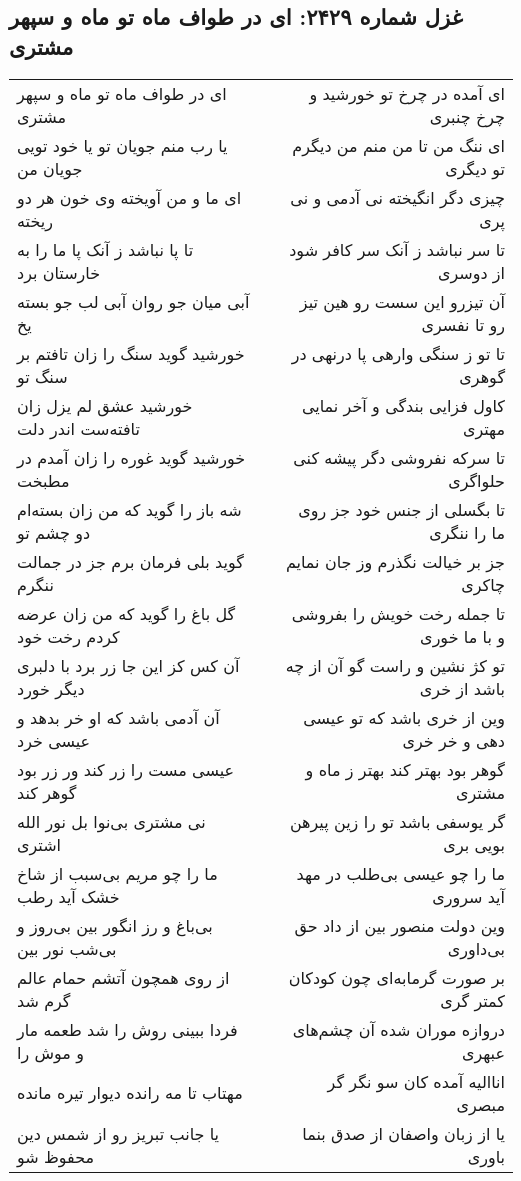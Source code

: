 \begin{center}
\section*{غزل شماره ۲۴۲۹: ای در طواف ماه تو ماه و سپهر مشتری}
\label{sec:2429}
\begin{longtable}{l p{0.5cm} r}
ای در طواف ماه تو ماه و سپهر مشتری
&&
ای آمده در چرخ تو خورشید و چرخ چنبری
\\
یا رب منم جویان تو یا خود تویی جویان من
&&
ای ننگ من تا من منم من دیگرم تو دیگری
\\
ای ما و من آویخته وی خون هر دو ریخته
&&
چیزی دگر انگیخته نی آدمی و نی پری
\\
تا پا نباشد ز آنک پا ما را به خارستان برد
&&
تا سر نباشد ز آنک سر کافر شود از دوسری
\\
آبی میان جو روان آبی لب جو بسته یخ
&&
آن تیزرو این سست رو هین تیز رو تا نفسری
\\
خورشید گوید سنگ را زان تافتم بر سنگ تو
&&
تا تو ز سنگی وارهی پا درنهی در گوهری
\\
خورشید عشق لم یزل زان تافته‌ست اندر دلت
&&
کاول فزایی بندگی و آخر نمایی مهتری
\\
خورشید گوید غوره را زان آمدم در مطبخت
&&
تا سرکه نفروشی دگر پیشه کنی حلواگری
\\
شه باز را گوید که من زان بسته‌ام دو چشم تو
&&
تا بگسلی از جنس خود جز روی ما را ننگری
\\
گوید بلی فرمان برم جز در جمالت ننگرم
&&
جز بر خیالت نگذرم وز جان نمایم چاکری
\\
گل باغ را گوید که من زان عرضه کردم رخت خود
&&
تا جمله رخت خویش را بفروشی و با ما خوری
\\
آن کس کز این جا زر برد با دلبری دیگر خورد
&&
تو کژ نشین و راست گو آن از چه باشد از خری
\\
آن آدمی باشد که او خر بدهد و عیسی خرد
&&
وین از خری باشد که تو عیسی دهی و خر خری
\\
عیسی مست را زر کند ور زر بود گوهر کند
&&
گوهر بود بهتر کند بهتر ز ماه و مشتری
\\
نی مشتری بی‌نوا بل نور الله اشتری
&&
گر یوسفی باشد تو را زین پیرهن بویی بری
\\
ما را چو مریم بی‌سبب از شاخ خشک آید رطب
&&
ما را چو عیسی بی‌طلب در مهد آید سروری
\\
بی‌باغ و رز انگور بین بی‌روز و بی‌شب نور بین
&&
وین دولت منصور بین از داد حق بی‌داوری
\\
از روی همچون آتشم حمام عالم گرم شد
&&
بر صورت گرمابه‌ای چون کودکان کمتر گری
\\
فردا ببینی روش را شد طعمه مار و موش را
&&
دروازه موران شده آن چشم‌های عبهری
\\
مهتاب تا مه رانده دیوار تیره مانده
&&
اناالیه آمده کان سو نگر گر مبصری
\\
یا جانب تبریز رو از شمس دین محفوظ شو
&&
یا از زبان واصفان از صدق بنما باوری
\\
\end{longtable}
\end{center}
